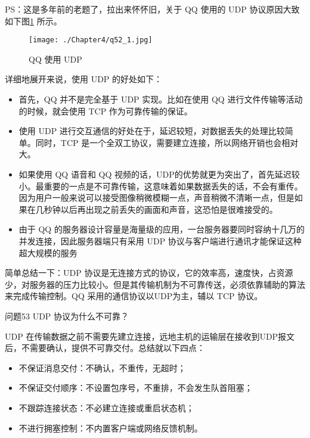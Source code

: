 \documentclass[cn,11pt,color=blue,lang=cn]{elegantbook}
\begin{document}
\begin{solution}
PS：这是多年前的老题了，拉出来怀怀旧，关于 QQ 使用的 UDP 协议原因大致如下图\ref{fig52_1} 所示。
\begin{figure}[!h]
\centering
\texttt{[image: ./Chapter4/q52\_1.jpg]}
\caption{QQ 使用 UDP}
\label{fig52_1}
\end{figure}

详细地展开来说，使用 UDP 的好处如下：
\begin{itemize}
	\item 首先，QQ 并不是完全基于 UDP 实现。比如在使用 QQ 进行文件传输等活动的时候，就会使用 TCP 作为可靠传输的保证。

	\item 使用 UDP 进行交互通信的好处在于，延迟较短，对数据丢失的处理比较简单。同时，TCP 是一个全双工协议，需要建立连接，所以网络开销也会相对大。

	\item 如果使用 QQ 语音和 QQ 视频的话，UDP的优势就更为突出了，首先延迟较小。最重要的一点是不可靠传输，这意味着如果数据丢失的话，不会有重传。因为用户一般来说可以接受图像稍微模糊一点，声音稍微不清晰一点，但是如果在几秒钟以后再出现之前丢失的画面和声音，这恐怕是很难接受的。

	\item 由于 QQ 的服务器设计容量是海量级的应用，一台服务器要同时容纳十几万的并发连接，因此服务器端只有采用 UDP 协议与客户端进行通讯才能保证这种超大规模的服务
\end{itemize}

简单总结一下：UDP 协议是无连接方式的协议，它的效率高，速度快，占资源少，对服务器的压力比较小。但是其传输机制为不可靠传送，必须依靠辅助的算法来完成传输控制。QQ 采用的通信协议以UDP为主，辅以 TCP 协议。

\end{solution}

\begin{custom}{问题53}
UDP 协议为什么不可靠？
\end{custom}

\begin{solution}
UDP 在传输数据之前不需要先建立连接，远地主机的运输层在接收到UDP报文后，不需要确认，提供不可靠交付。总结就以下四点：
\begin{itemize}
	\item 不保证消息交付：不确认，不重传，无超时；
	\item 不保证交付顺序：不设置包序号，不重排，不会发生队首阻塞；
	\item 不跟踪连接状态：不必建立连接或重启状态机；
	\item 不进行拥塞控制：不内置客户端或网络反馈机制。
\end{itemize}
\end{solution}
\end{document}
